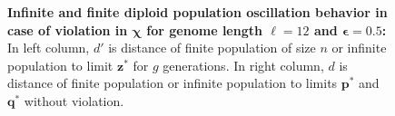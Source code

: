 \begin{figure}[h]
\begin{center}
\hspace{-3em}%
\vspace{-0.5em}  \hspace{-3em}%


\caption[\textbf{Infinite and finite diploid population oscillation behavior in case of violation in $\bm{\chi}$ for genome length $\ell = 12$ and $\bm{\epsilon} = 0.5$}]{\textbf{Infinite and finite diploid population oscillation behavior in case of violation in $\bm{\chi}$ for genome length $\ell = 12$ and $\bm{\epsilon} = 0.5$:} 
  In left column, $d'$ is distance of finite population of size $n$ or infinite population to limit $\bm{z}^\ast$ for $g$ generations. In right column, $d$ is distance of finite population or infinite population to limits $\bm{p}^\ast$ and $\bm{q}^\ast$ without violation.}
\label{oscillation_12d_vio_chi_0.5}
\end{center}
\end{figure}

